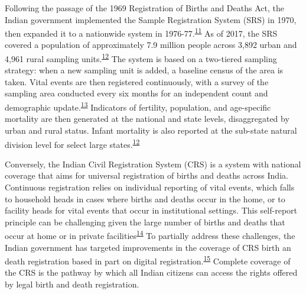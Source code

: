 \documentclass[
]{article}
\begin{document}
Following the passage of the 1969 Registration of Births and Deaths Act, the Indian government implemented the Sample Registration System (SRS) in 1970, then expanded it to a nationwide system in 1976-77.\textsuperscript{\protect\hyperlink{ref-Bhat2002}{11}} As of 2017, the SRS covered a population of approximately 7.9 million people across 3,892 urban and 4,961 rural sampling units.\textsuperscript{\protect\hyperlink{ref-CensusofIndia2017}{12}} The system is based on a two-tiered sampling strategy: when a new sampling unit is added, a baseline census of the area is taken. Vital events are then registered continuously, with a survey of the sampling area conducted every six months for an independent count and demographic update.\textsuperscript{\protect\hyperlink{ref-Mahapatra2010}{13}} Indicators of fertility, population, and age-specific mortality are then generated at the national and state levels, disaggregated by urban and rural status. Infant mortality is also reported at the sub-state natural division level for select large states.\textsuperscript{\protect\hyperlink{ref-CensusofIndia2017}{12}}

Conversely, the Indian Civil Registration System (CRS) is a system with national coverage that aims for universal registration of births and deaths across India. Continuous registration relies on individual reporting of vital events, which falls to household heads in cases where births and deaths occur in the home, or to facility heads for vital events that occur in institutional settings. This self-report principle can be challenging given the large number of births and deaths that occur at home or in private facilities\textsuperscript{\protect\hyperlink{ref-Mohanty2018}{14}} To partially address these challenges, the Indian government has targeted improvements in the coverage of CRS birth an death registration based in part on digital registration.\textsuperscript{\protect\hyperlink{ref-Kumar2019}{15}} Complete coverage of the CRS is the pathway by which all Indian citizens can access the rights offered by legal birth and death registration.
\end{document}
